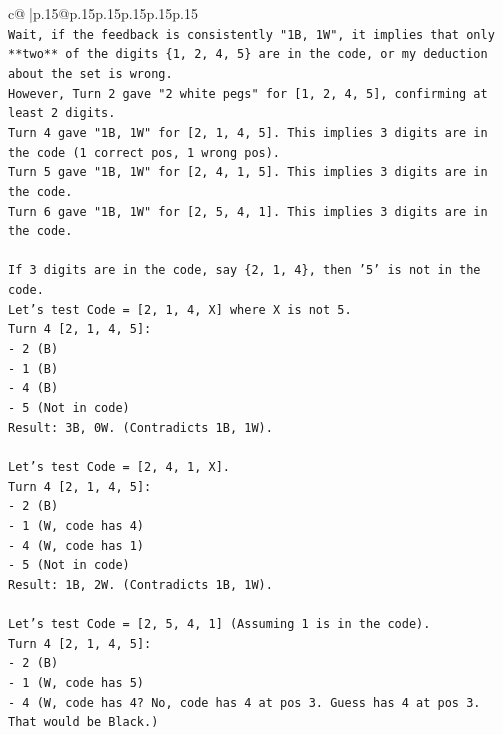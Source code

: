 \documentclass{article}
\begin{document}
{\begin{supertabular}{c@{$\;$}|p{.15\linewidth}@{}p{.15\linewidth}p{.15\linewidth}p{.15\linewidth}p{.15\linewidth}p{.15\linewidth}}
{{{\\ 
\texttt{Wait, if the feedback is consistently "1B, 1W", it implies that only **two** of the digits \{1, 2, 4, 5\} are in the code, or my deduction about the set is wrong.} \\
\texttt{However, Turn 2 gave "2 white pegs" for {[}1, 2, 4, 5{]}, confirming at least 2 digits.} \\
\texttt{Turn 4 gave "1B, 1W" for {[}2, 1, 4, 5{]}. This implies 3 digits are in the code (1 correct pos, 1 wrong pos).} \\
\texttt{Turn 5 gave "1B, 1W" for {[}2, 4, 1, 5{]}. This implies 3 digits are in the code.} \\
\texttt{Turn 6 gave "1B, 1W" for {[}2, 5, 4, 1{]}. This implies 3 digits are in the code.} \\
\\ 
\texttt{If 3 digits are in the code, say \{2, 1, 4\}, then '5' is not in the code.} \\
\texttt{Let's test Code = {[}2, 1, 4, X{]} where X is not 5.} \\
\texttt{Turn 4 {[}2, 1, 4, 5{]}:} \\
\texttt{{-} 2 (B)} \\
\texttt{{-} 1 (B)} \\
\texttt{{-} 4 (B)} \\
\texttt{{-} 5 (Not in code)} \\
\texttt{Result: 3B, 0W. (Contradicts 1B, 1W).} \\
\\ 
\texttt{Let's test Code = {[}2, 4, 1, X{]}.} \\
\texttt{Turn 4 {[}2, 1, 4, 5{]}:} \\
\texttt{{-} 2 (B)} \\
\texttt{{-} 1 (W, code has 4)} \\
\texttt{{-} 4 (W, code has 1)} \\
\texttt{{-} 5 (Not in code)} \\
\texttt{Result: 1B, 2W. (Contradicts 1B, 1W).} \\
\\ 
\texttt{Let's test Code = {[}2, 5, 4, 1{]} (Assuming 1 is in the code).} \\
\texttt{Turn 4 {[}2, 1, 4, 5{]}:} \\
\texttt{{-} 2 (B)} \\
\texttt{{-} 1 (W, code has 5)} \\
\texttt{{-} 4 (W, code has 4? No, code has 4 at pos 3. Guess has 4 at pos 3. That would be Black.)} \\
}}}
\end{supertabular}}
\end{document}
